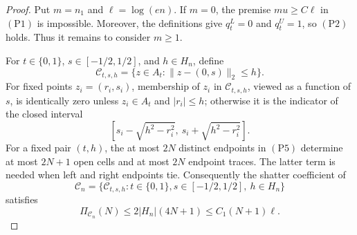 \documentclass{article}
\begin{document}
\begin{proof}
Put \(m=n_1\) and \(\ell=\log(en)\).  If \(m=0\), the premise
\(mu\geq C\ell\) in \((\mathrm{P1})\) is impossible.  Moreover, the
definitions give \(q_t^L=0\) and \(q_t^U=1\), so \((\mathrm{P2})\) holds.
Thus it remains to consider \(m\geq1\).

For \(t\in\{0,1\}\), \(s\in[-1/2,1/2]\), and \(h\in H_n\), define
\[
 \mathcal C_{t,s,h}
 =\{z\in A_t:\|z-(0,s)\|_2\leq h\}.
 \tag{P4}
\]
For fixed points \(z_i=(r_i,s_i)\), membership of \(z_i\) in
\(\mathcal C_{t,s,h}\), viewed as a function of \(s\), is identically zero
unless \(z_i\in A_t\) and \(|r_i|\leq h\); otherwise it is the indicator of
the closed interval
\[
 [s_i-\sqrt{h^2-r_i^2},\ s_i+\sqrt{h^2-r_i^2}].
 \tag{P5}
\]
For a fixed pair \((t,h)\), the at most \(2N\) distinct endpoints in
\((\mathrm{P5})\) determine at most \(2N+1\) open cells and at most \(2N\)
endpoint traces.  The latter term is needed when left and right endpoints
tie.  Consequently the shatter coefficient of
\[
 \mathcal C_n=\{\mathcal C_{t,s,h}:t\in\{0,1\},
 s\in[-1/2,1/2],\ h\in H_n\}
\]
satisfies
\[
 \Pi_{\mathcal C_n}(N)
 \leq2|H_n|(4N+1)\leq C_1(N+1)\ell .
 \tag{P6}
\]


\end{proof}
\end{document}
